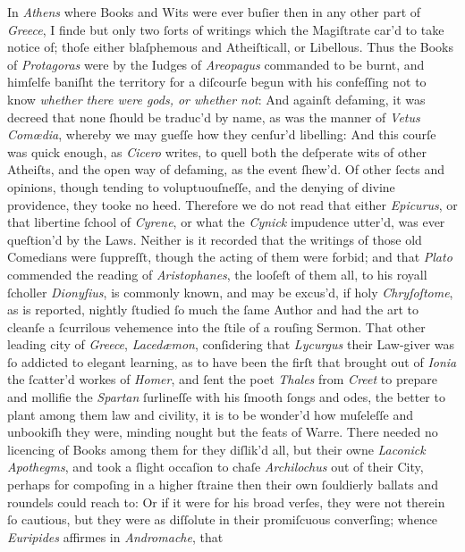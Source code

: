 In \textit{Athens} where Books and Wits were ever buſier then in any other part
of \textit{Greece}, I finde but only two ſorts of writings which the Magiſtrate
car'd to take notice of; thoſe either blaſphemous and Atheiſticall, or
Libellous.  Thus the Books of \textit{Protagoras} were by the Iudges of
\textit{Areopagus} commanded to be burnt, and himſelfe baniſht the territory for
a diſcourſe begun with his confeſſing not to know \textit{whether there were
gods, or whether not}: And againſt defaming, it was decreed that none ſhould be
traduc'd by name, as was the manner of \textit{Vetus Comœdia}, whereby we may
gueſſe how they cenſur'd libelling: And this courſe was quick enough, as
\textit{Cicero} writes, to quell both the deſperate wits of other Atheiſts, and
the open way of defaming, as the event ſhew'd.  Of other ſects and opinions,
though tending to voluptuouſneſſe, and the denying of divine providence, they
tooke no heed.  Therefore we do not read that either \textit{Epicurus}, or that
libertine ſchool of \textit{Cyrene}, or what the \textit{Cynick} impudence
utter'd, was ever queſtion'd by the Laws.  Neither is it recorded that the
writings of those old Comedians were ſuppreſſt, though the acting of them were
forbid; and that \textit{Plato} commended the reading of \textit{Aristophanes},
the looſeſt of them all, to his royall ſcholler \textit{Dionyſius}, is commonly
known, and may be excus'd, if holy \textit{Chryſoſtome}, as is reported, nightly
ſtudied ſo much the ſame Author and had the art to cleanſe a ſcurrilous
vehemence into the ſtile of a rouſing Sermon.  That other leading city of
\textit{Greece}, \textit{Lacedæmon}, conſidering that \textit{Lycurgus} their
Law-giver was ſo addicted to elegant learning, as to have been the firſt that
brought out of \textit{Ionia} the ſcatter'd workes of \textit{Homer}, and ſent
the poet \textit{Thales} from \textit{Creet} to prepare and mollifie the
\textit{Spartan} ſurlineſſe with his ſmooth ſongs and odes, the better to plant
among them law and civility, it is to be wonder'd how muſeleſſe and unbookiſh
they were, minding nought but the feats of Warre.  There needed no licencing of
Books among them for they diſlik'd all, but their owne \textit{Laconick
Apothegms}, and took a ſlight occaſion to chaſe \textit{Archilochus} out of
their City, perhaps for compoſing in a higher ſtraine then their own ſouldierly
ballats and roundels could reach to: Or if it were for his broad verſes, they
were not therein ſo cautious, but they were as diſſolute in their promiſcuous
converſing; whence \textit{Euripides} affirmes in \textit{Andromache}, that
